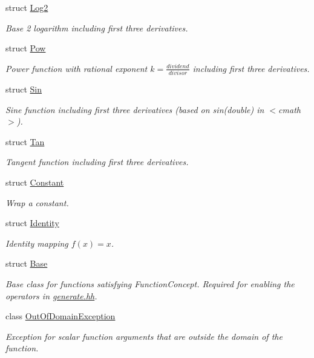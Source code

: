 \begin{DoxyCompactItemize}
struct \hyperlink{structFunG_1_1Log2}{Log2}
\begin{DoxyCompactList}\small\item\em Base 2 logarithm including first three derivatives. \end{DoxyCompactList}\item 
struct \hyperlink{structFunG_1_1Pow}{Pow}
\begin{DoxyCompactList}\small\item\em Power function with rational exponent $ k = \frac{dividend}{divisor} $ including first three derivatives. \end{DoxyCompactList}\item 
struct \hyperlink{structFunG_1_1Sin}{Sin}
\begin{DoxyCompactList}\small\item\em Sine function including first three derivatives (based on sin(double) in $<$cmath$>$). \end{DoxyCompactList}\item 
struct \hyperlink{structFunG_1_1Tan}{Tan}
\begin{DoxyCompactList}\small\item\em Tangent function including first three derivatives. \end{DoxyCompactList}\item 
struct \hyperlink{structFunG_1_1Constant}{Constant}
\begin{DoxyCompactList}\small\item\em Wrap a constant. \end{DoxyCompactList}\item 
struct \hyperlink{structFunG_1_1Identity}{Identity}
\begin{DoxyCompactList}\small\item\em Identity mapping $ f(x)=x $. \end{DoxyCompactList}\item 
struct \hyperlink{structFunG_1_1Base}{Base}
\begin{DoxyCompactList}\small\item\em Base class for functions satisfying Function\-Concept. Required for enabling the operators in \hyperlink{generate_8hh_source}{generate.\-hh}. \end{DoxyCompactList}\item 
class \hyperlink{classFunG_1_1OutOfDomainException}{Out\-Of\-Domain\-Exception}
\begin{DoxyCompactList}\small\item\em Exception for scalar function arguments that are outside the domain of the function. \end{DoxyCompactList}\item 

\end{DoxyCompactItemize}
